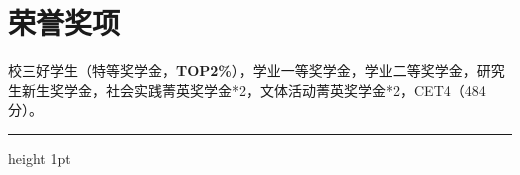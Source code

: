 \documentclass[11pt,a4paper]{article}
\begin{document}

	
	\section*{\textnormal{\textbf{荣誉奖项}}}
	\noindent
	校三好学生（特等奖学金，\textbf{TOP2\%}），学业一等奖学金，学业二等奖学金，研究生新生奖学金，社会实践菁英奖学金*2，文体活动菁英奖学金*2，CET4（484分）。
	
	\vspace{1mm}
	\hrule height 1pt
	\vspace{1mm}
	
\end{document}
